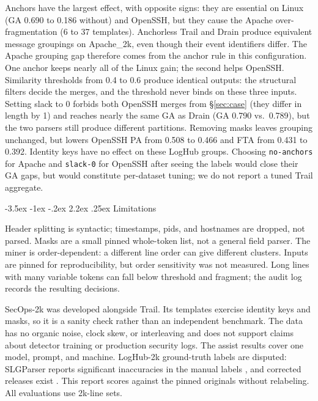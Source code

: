 \documentclass[11pt]{article}
\makeatletter
\renewcommand\section{\@startsection{section}{1}{\z@}%
  {-3.5ex \@plus -1ex \@minus -.2ex}%
  {2.2ex \@plus .25ex}%
  {\normalfont\Large\bfseries}}
\makeatother
\begin{document}
Anchors have the largest effect, with opposite signs: they are
essential on Linux (GA 0.690 to 0.186 without) and OpenSSH, but they cause the
Apache over-fragmentation (6 to 37 templates). Anchorless Trail and
Drain produce equivalent message groupings on Apache\_2k, even though
their event identifiers differ. The Apache grouping gap therefore
comes from the anchor rule in this configuration.
One anchor keeps nearly all of the Linux gain; the second helps
OpenSSH. Similarity thresholds from 0.4 to 0.6 produce identical
outputs: the structural filters decide the merges, and the threshold
never binds on these three inputs.
Setting slack to 0 forbids both OpenSSH merges from \S\ref{sec:case}
(they differ in length by 1) and reaches nearly the same GA as Drain
(GA 0.790 vs.\ 0.789), but the two parsers still produce different
partitions. Removing masks leaves grouping unchanged, but lowers
OpenSSH PA from 0.508 to 0.466 and FTA from 0.431 to 0.392. Identity
keys have no effect on these LogHub groups. Choosing
\texttt{no-anchors} for Apache and \texttt{slack-0} for OpenSSH after
seeing the labels would close their GA gaps, but would constitute
per-dataset tuning; we do not report a tuned Trail aggregate.

\section{Limitations}
\label{sec:limits}

Header splitting is syntactic; timestamps, pids, and hostnames are
dropped, not parsed. Masks are a small pinned whole-token list, not a
general field parser. The miner is order-dependent: a different line
order can give different clusters. Inputs are pinned for
reproducibility, but order sensitivity was not measured. Long lines
with many variable tokens can fall below threshold and fragment; the
audit log records the resulting decisions.

SecOps-2k was developed alongside Trail. Its templates exercise
identity keys and masks, so it is a sanity check rather than an
independent benchmark. The data has no organic noise, clock skew, or
interleaving and does not support claims about detector training or
production security logs. The assist results cover one model, prompt,
and machine. LogHub-2k ground-truth labels are disputed: SLGParser
reports significant inaccuracies in the manual labels
\cite{slgparser}, and corrected releases exist
\cite{loghub-corrected}. This report scores against the pinned
originals without relabeling. All evaluations use 2k-line sets.
\end{document}
